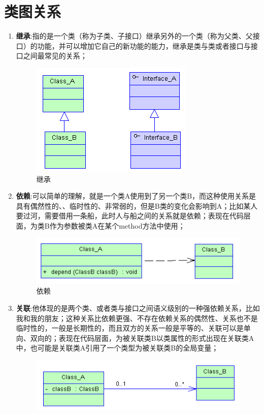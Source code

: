 \documentclass[UTF8,a4paper,12pt]{ctexbook}
\begin{document}
\section{类图关系}
	\begin{enumerate}
		\item \textbf{继承}:指的是一个类（称为子类、子接口）继承另外的一个类（称为父类、父接口）的功能，并可以增加它自己的新功能的能力，继承是类与类或者接口与接口之间最常见的关系；
			\begin{figure}[h]
				\centering
				\includegraphics[scale = 0.7]{DeriveShip.jpg}
				\caption{继承}
			\end{figure}
		\item \textbf{依赖}:可以简单的理解，就是一个类A使用到了另一个类B，而这种使用关系是具有偶然性的、、临时性的、非常弱的，但是B类的变化会影响到A；比如某人要过河，需要借用一条船，此时人与船之间的关系就是依赖；表现在代码层面，为类B作为参数被类A在某个method方法中使用；
			\begin{figure}[h]
				\centering
				\includegraphics[scale = 0.7]{DependShip.jpg}
				\caption{依赖}
			\end{figure}
		\item \textbf{关联}:他体现的是两个类、或者类与接口之间语义级别的一种强依赖关系，比如我和我的朋友；这种关系比依赖更强、不存在依赖关系的偶然性、关系也不是临时性的，一般是长期性的，而且双方的关系一般是平等的、关联可以是单向、双向的；表现在代码层面，为被关联类B以类属性的形式出现在关联类A中，也可能是关联类A引用了一个类型为被关联类B的全局变量；
			\begin{figure}[h]
				\centering
				\includegraphics[scale = 0.7]{Association.jpg}

\end{figure}
\end{enumerate}
\end{document}

